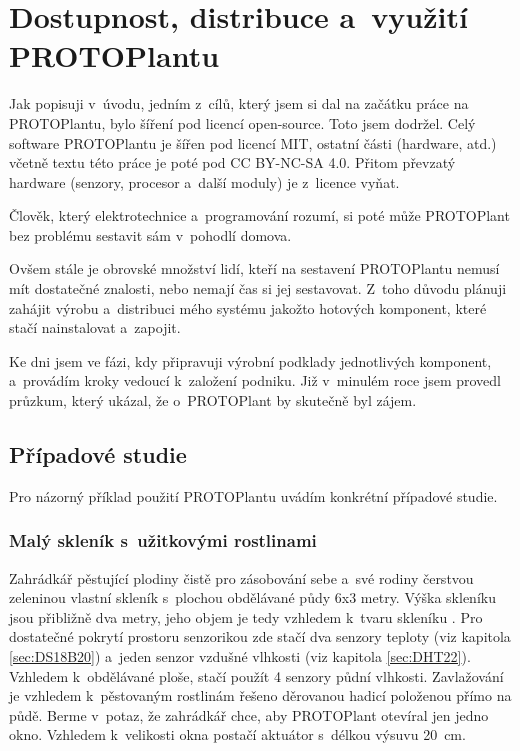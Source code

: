 \chapter{Dostupnost, distribuce a~využití PROTOPlantu}
Jak popisuji v~úvodu, jedním z~cílů, který jsem si dal na začátku práce na PROTOPlantu, bylo šíření pod licencí open-source.
Toto jsem dodržel. 
Celý software PROTOPlantu je šířen pod licencí MIT, ostatní části (hardware, atd.) včetně textu této práce je poté pod CC BY-NC-SA 4.0.
Přitom převzatý hardware (senzory, procesor a~další moduly) je z~licence vyňat.

Člověk, který elektrotechnice a~programování rozumí, si poté může PROTOPlant bez problému sestavit sám v~pohodlí domova.

Ovšem stále je obrovské množství lidí, kteří na sestavení PROTOPlantu nemusí mít dostatečné znalosti, nebo nemají čas si jej sestavovat.
Z~toho důvodu plánuji zahájit výrobu a~distribuci mého systému jakožto hotových komponent, které stačí nainstalovat a~zapojit.

Ke dni  jsem ve fázi, kdy připravuji výrobní podklady jednotlivých komponent, a~provádím kroky vedoucí k~založení podniku.
Již v~minulém roce jsem provedl průzkum, který ukázal, že o~PROTOPlant by skutečně byl zájem.

\section{Případové studie}
Pro názorný příklad použití PROTOPlantu uvádím konkrétní případové studie.

\subsection{Malý skleník s~užitkovými rostlinami}
Zahrádkář pěstující plodiny čistě pro zásobování sebe a~své rodiny čerstvou zeleninou vlastní skleník s~plochou obdělávané půdy 6x3 metry.
Výška skleníku jsou přibližně dva metry, jeho objem je tedy vzhledem k~tvaru skleníku .
Pro dostatečné pokrytí prostoru senzorikou zde stačí dva senzory teploty (viz kapitola \ref{sec:DS18B20}) a~jeden senzor vzdušné vlhkosti (viz kapitola \ref{sec:DHT22}). 
Vzhledem k~obdělávané ploše, stačí použít 4 senzory půdní vlhkosti.
Zavlažování je vzhledem k~pěstovaným rostlinám řešeno děrovanou hadicí položenou přímo na půdě.
Berme v~potaz, že zahrádkář chce, aby PROTOPlant otevíral jen jedno okno.
Vzhledem k~velikosti okna postačí aktuátor s~délkou výsuvu 20~cm.

